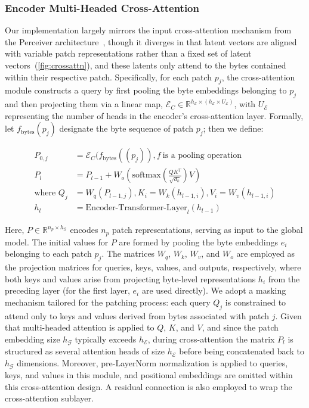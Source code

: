 \subsubsection{Encoder Multi-Headed Cross-Attention}
\label{sec:enc-cross-attn}
Our implementation largely mirrors the input cross-attention mechanism from the Perceiver architecture~\citep{jaegle2021perceiver}, though it diverges in that latent vectors are aligned with variable patch representations rather than a fixed set of latent vectors~(\autoref{fig:crossattn}), and these latents only attend to the bytes contained within their respective patch. Specifically, for each patch $p_j$, the cross-attention module constructs a query by first pooling the byte embeddings belonging to $p_j$ and then projecting them via a linear map, $\mathcal{E}_{C} \in \mathbb{R}^{h_{\mathcal{E}} \times (h_{\mathcal{E}} \times U_{\mathcal{E}})}$, with $U_{\mathcal{E}}$ representing the number of heads in the encoder’s cross-attention layer. Formally, let $f_{\text{bytes}}(p_j)$ designate the byte sequence of patch $p_j$; then we define:

\begin{align}
P_{0,j} &= \mathcal{E}_{C}(f_\text{bytes}((p_j)), f~\text{is a pooling operation} \\
P_l &= P_{l-1} + W_o\left(\text{softmax}\left(\frac{QK^T}{\sqrt{d_k}}\right)V\right) \\
\text{where } Q_j &= W_q(P_{l-1,j}), K_i = W_k(h_{l-1,i}), V_i = W_v(h_{l-1,i}) \\
h_l &= \text{Encoder-Transformer-Layer}_l(h_{l-1})
\end{align}

Here, $P \in \mathbb{R}^{n_p \times h_{\mathcal{G}}}$ encodes $n_p$ patch representations, serving as input to the global model. The initial values for $P$ are formed by pooling the byte embeddings $e_i$ belonging to each patch $p_j$. The matrices $W_q$, $W_k$, $W_v$, and $W_o$ are employed as the projection matrices for queries, keys, values, and outputs, respectively, where both keys and values arise from projecting byte-level representations $h_i$ from the preceding layer (for the first layer, $e_i$ are used directly). We adopt a masking mechanism tailored for the patching process: each query $Q_j$ is constrained to attend only to keys and values derived from bytes associated with patch $j$. Given that multi-headed attention is applied to $Q$, $K$, and $V$, and since the patch embedding size $h_{\mathcal{G}}$ typically exceeds $h_{\mathcal{E}}$, during cross-attention the matrix $P_l$ is structured as several attention heads of size $h_{\mathcal{E}}$ before being concatenated back to $h_{\mathcal{G}}$ dimensions. Moreover, pre-LayerNorm normalization is applied to queries, keys, and values in this module, and positional embeddings are omitted within this cross-attention design. A residual connection is also employed to wrap the cross-attention sublayer.

